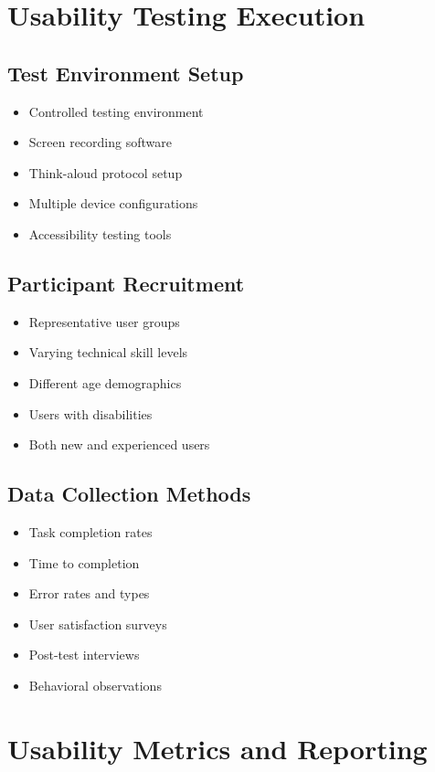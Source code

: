 \documentclass[12pt,a4paper]{article}
\begin{document}
\section{Usability Testing Execution}

\subsection{Test Environment Setup}
\begin{itemize}
    \item Controlled testing environment
    \item Screen recording software
    \item Think-aloud protocol setup
    \item Multiple device configurations
    \item Accessibility testing tools
\end{itemize}

\subsection{Participant Recruitment}
\begin{itemize}
    \item Representative user groups
    \item Varying technical skill levels
    \item Different age demographics
    \item Users with disabilities
    \item Both new and experienced users
\end{itemize}

\subsection{Data Collection Methods}
\begin{itemize}
    \item Task completion rates
    \item Time to completion
    \item Error rates and types
    \item User satisfaction surveys
    \item Post-test interviews
    \item Behavioral observations
\end{itemize}

\section{Usability Metrics and Reporting}
\end{document}
